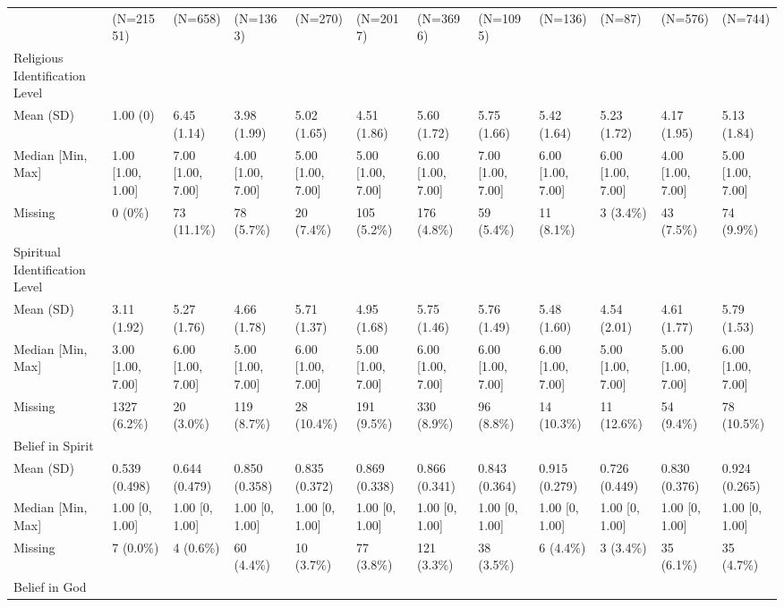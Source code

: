\documentclass[
  single column]{article}
\begin{document}
\begin{landscape}
\begin{longtable}[t]{llllllllllll}
\endfoot
\bottomrule
\endlastfoot
 & (N=21551) & (N=658) & (N=1363) & (N=270) & (N=2017) & (N=3696) & (N=1095) & (N=136) & (N=87) & (N=576) & (N=744)\\
Religious Identification Level &  &  &  &  &  &  &  &  &  &  & \\
Mean (SD) & 1.00 (0) & 6.45 (1.14) & 3.98 (1.99) & 5.02 (1.65) & 4.51 (1.86) & 5.60 (1.72) & 5.75 (1.66) & 5.42 (1.64) & 5.23 (1.72) & 4.17 (1.95) & 5.13 (1.84)\\
Median [Min, Max] & 1.00 [1.00, 1.00] & 7.00 [1.00, 7.00] & 4.00 [1.00, 7.00] & 5.00 [1.00, 7.00] & 5.00 [1.00, 7.00] & 6.00 [1.00, 7.00] & 7.00 [1.00, 7.00] & 6.00 [1.00, 7.00] & 6.00 [1.00, 7.00] & 4.00 [1.00, 7.00] & 5.00 [1.00, 7.00]\\
Missing & 0 (0\%) & 73 (11.1\%) & 78 (5.7\%) & 20 (7.4\%) & 105 (5.2\%) & 176 (4.8\%) & 59 (5.4\%) & 11 (8.1\%) & 3 (3.4\%) & 43 (7.5\%) & 74 (9.9\%)\\
\addlinespace
Spiritual Identification Level &  &  &  &  &  &  &  &  &  &  & \\
Mean (SD) & 3.11 (1.92) & 5.27 (1.76) & 4.66 (1.78) & 5.71 (1.37) & 4.95 (1.68) & 5.75 (1.46) & 5.76 (1.49) & 5.48 (1.60) & 4.54 (2.01) & 4.61 (1.77) & 5.79 (1.53)\\
Median [Min, Max] & 3.00 [1.00, 7.00] & 6.00 [1.00, 7.00] & 5.00 [1.00, 7.00] & 6.00 [1.00, 7.00] & 5.00 [1.00, 7.00] & 6.00 [1.00, 7.00] & 6.00 [1.00, 7.00] & 6.00 [1.00, 7.00] & 5.00 [1.00, 7.00] & 5.00 [1.00, 7.00] & 6.00 [1.00, 7.00]\\
Missing & 1327 (6.2\%) & 20 (3.0\%) & 119 (8.7\%) & 28 (10.4\%) & 191 (9.5\%) & 330 (8.9\%) & 96 (8.8\%) & 14 (10.3\%) & 11 (12.6\%) & 54 (9.4\%) & 78 (10.5\%)\\
Belief in Spirit &  &  &  &  &  &  &  &  &  &  & \\
\addlinespace
Mean (SD) & 0.539 (0.498) & 0.644 (0.479) & 0.850 (0.358) & 0.835 (0.372) & 0.869 (0.338) & 0.866 (0.341) & 0.843 (0.364) & 0.915 (0.279) & 0.726 (0.449) & 0.830 (0.376) & 0.924 (0.265)\\
Median [Min, Max] & 1.00 [0, 1.00] & 1.00 [0, 1.00] & 1.00 [0, 1.00] & 1.00 [0, 1.00] & 1.00 [0, 1.00] & 1.00 [0, 1.00] & 1.00 [0, 1.00] & 1.00 [0, 1.00] & 1.00 [0, 1.00] & 1.00 [0, 1.00] & 1.00 [0, 1.00]\\
Missing & 7 (0.0\%) & 4 (0.6\%) & 60 (4.4\%) & 10 (3.7\%) & 77 (3.8\%) & 121 (3.3\%) & 38 (3.5\%) & 6 (4.4\%) & 3 (3.4\%) & 35 (6.1\%) & 35 (4.7\%)\\
Belief in God &  &  &  &  &  &  &  &  &  &  & \\

\end{longtable}
\end{landscape}
\end{document}
